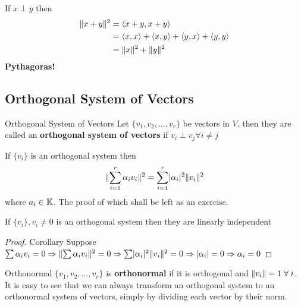 \begin{observe}
    If \(x \perp y\) then \begin{align*}
        \lVert x+y\rVert^2 & =  \langle x+y, x+y \rangle                                                              \\
                     & = \langle x, x \rangle + \langle x, y \rangle + \langle y, x \rangle + \langle y, y \rangle \\
                     & = \lVert x\rVert^2 + \lVert y\rVert^2
    \end{align*}
    \textbf{Pythagoras!}
\end{observe}

\subsection{Orthogonal System of Vectors}
\begin{definition} {Orthogonal System of Vectors}
    Let \(\{v_1, v_2, \dots, v_r\}\) be vectors in \(V\), then they are called an \textbf{orthogonal system of vectors} if \(v_i \perp v_j \forall i \neq j\)
\end{definition}

\begin{lemma}
    If \(\{v_i\}\) is an orthogonal system then \[
        \lVert\sum_{i=1}^{r} \alpha_i v_i\rVert^2 = \sum_{i=1}^{r} \lvert\alpha_i\rvert^2 \lVert v_i\rVert^2
    \]
    where \(a_i \in \mathbb{K}\). The proof of which shall be left as an exercise.
\end{lemma}

\begin{corollary}
    If \(\{v_i\}, v_i \neq 0\) is an orthogonal system then they are linearly independent
\end{corollary}

\begin{proof} {Corollary}
    Suppose \(\sum \alpha_i v_i = 0 \Rightarrow \lVert\sum \alpha_i v_i\rVert^2 = 0 \Rightarrow \sum \lvert\alpha_i\rvert^2 \lVert v_i\rVert^2 = 0 \Rightarrow \lvert\alpha_i\rvert = 0 \Rightarrow \alpha_i = 0\)
\end{proof}

\begin{definition} {Orthonormal}
    \(\{v_1, v_2, \dots, v_r\}\) is \textbf{orthonormal} if it is orthogonal and \(\norm{v_i} = 1 \forall i\). It is easy to see that we can always transform an orthogonal system to an orthonormal system of vectors, simply by dividing each vector by their norm.
\end{definition}

